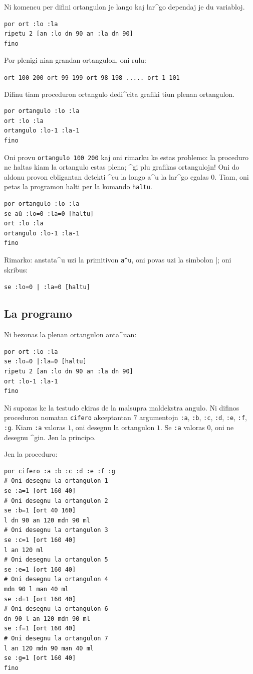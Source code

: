 Ni komencu per difini ortangulon je lango kaj lar^go dependaj je du
variabloj.
\begin{verbatim}
por ort :lo :la
ripetu 2 [an :lo dn 90 an :la dn 90]
fino
\end{verbatim}
Por plenigi nian grandan ortangulon, oni rulu:

\texttt{ort 100 200 ort 99 199 ort 98 198  ..... ort 1 101}

Difinu tiam proceduron ortangulo dedi^cita grafiki tiun plenan ortangulon.
\begin{verbatim}
por ortangulo :lo :la
ort :lo :la
ortangulo :lo-1 :la-1
fino
\end{verbatim}
Oni provu \texttt{ortangulo 100 200} kaj oni rimarku ke estas
problemo: la proceduro ne haltas kiam la ortangulo estas plena; ^gi
plu grafikas ortangulojn!  Oni do aldonu provon ebligantan detekti ^cu
la longo a^u la lar^go egalas $0$.  Tiam, oni petas la programon halti
per la komando \texttt{haltu}.
\begin{verbatim}
por ortangulo :lo :la
se aŭ :lo=0 :la=0 [haltu]
ort :lo :la
ortangulo :lo-1 :la-1
fino
\end{verbatim}
Rimarko: anstata^u uzi la primitivon \texttt{a^u}, oni povas uzi la
simbolon \og|\fg; oni skribus:
\begin{center}
\texttt{se :lo=0 | :la=0 [haltu]}
\end{center}

\subsection{La programo}
\noindent Ni bezonas la plenan ortangulon anta^uan:
\begin{verbatim}
por ort :lo :la
se :lo=0 |:la=0 [haltu]
ripetu 2 [an :lo dn 90 an :la dn 90]
ort :lo-1 :la-1
fino
\end{verbatim}

Ni supozas ke la testudo ekiras de la malsupra maldekstra angulo.  Ni
difinos proceduron nomatan \texttt{cifero} akceptantan $7$ argumentojn
\texttt{:a}, \texttt{:b}, \texttt{:c}, \texttt{:d}, \texttt{:e},
\texttt{:f}, \texttt{:g}.  Kiam \texttt{:a} valoras $1$, oni desegnu
la ortangulon $1$.  Se \texttt{:a} valoras $0$, oni ne desegnu ^gin.
Jen la principo.

Jen la proceduro:
\begin{verbatim}
por cifero :a :b :c :d :e :f :g
# Oni desegnu la ortangulon 1
se :a=1 [ort 160 40]
# Oni desegnu la ortangulon 2
se :b=1 [ort 40 160]
l dn 90 an 120 mdn 90 ml
# Oni desegnu la ortangulon 3
se :c=1 [ort 160 40]
l an 120 ml
# Oni desegnu la ortangulon 5
se :e=1 [ort 160 40]
# Oni desegnu la ortangulon 4
mdn 90 l man 40 ml
se :d=1 [ort 160 40]
# Oni desegnu la ortangulon 6
dn 90 l an 120 mdn 90 ml
se :f=1 [ort 160 40]
# Oni desegnu la ortangulon 7
l an 120 mdn 90 man 40 ml
se :g=1 [ort 160 40]
fino
\end{verbatim}
